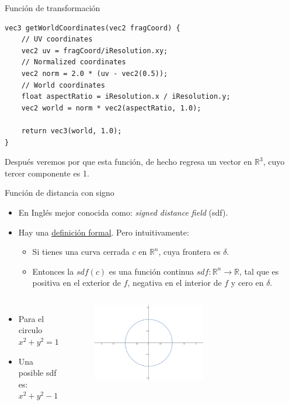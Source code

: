 \begin{frame}[fragile]{Función de transformación}
\begin{listing}
\begin{verbatim}
vec3 getWorldCoordinates(vec2 fragCoord) {
    // UV coordinates
    vec2 uv = fragCoord/iResolution.xy;
    // Normalized coordinates
    vec2 norm = 2.0 * (uv - vec2(0.5));
    // World coordinates
    float aspectRatio = iResolution.x / iResolution.y;
    vec2 world = norm * vec2(aspectRatio, 1.0);
    
    return vec3(world, 1.0);
}
\end{verbatim}
\end{listing}
Después veremos por que esta función, de hecho regresa un vector en $\mathbb{R}^3$, cuyo tercer componente es 1.
\end{frame}


\begin{frame}{Función de distancia con signo}

\begin{itemize}
    \item En Inglés mejor conocida como: \emph{signed distance field} (sdf).
    \item Hay una \href{https://en.wikipedia.org/wiki/Signed_distance_function}{definición formal}. Pero intuitivamente:
    \begin{itemize}
        \item Si tienes una curva cerrada $c$ en $\mathbb{R}^n$, cuya frontera es $\delta$.
        \item Entonces la $sdf(c)$ es una función continua $sdf: \mathbb{R}^n \rightarrow \mathbb{R}$, tal que es positiva en el exterior de $f$, negativa en el interior de $f$ y cero en $\delta$.
    \end{itemize}
\end{itemize}
\begin{columns}
     \begin{itemize}
         \item Para el circulo $x^2 + y^2 = 1$
         \item Una posible sdf es: $x^2 + y^2 - 1$
     \end{itemize}
        \begin{figure}[htb]
            \centering
            \includegraphics[width=0.6\textwidth]{img/unitCircle.png}
        \end{figure}
\end{columns}
\end{frame}


